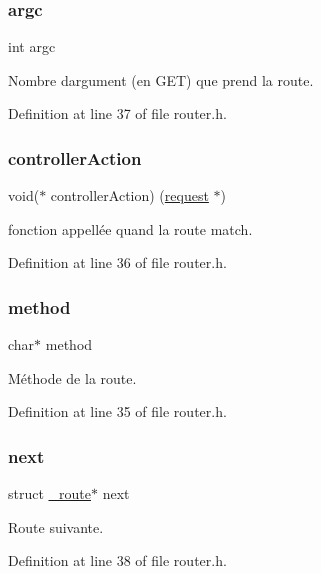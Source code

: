 \subsubsection{\texorpdfstring{argc}{argc}}
{\footnotesize\ttfamily int argc}

Nombre d\textquotesingle{}argument (en G\+ET) que prend la route. 

Definition at line 37 of file router.\+h.

\mbox{\label{struct__route_a36cb5ce2683da834da4b34eab0b3c8d5}} 
\subsubsection{\texorpdfstring{controller\+Action}{controllerAction}}
{\footnotesize\ttfamily void($\ast$ controller\+Action) (\mbox{\hyperlink{request_8h_a4a26bb67a195367b798ac6ad628c21a2}{request}} $\ast$)}

fonction appellée quand la route match. 

Definition at line 36 of file router.\+h.

\mbox{\label{struct__route_aca2544ecce27ac7a7e973d466c3a8fd4}} 
\subsubsection{\texorpdfstring{method}{method}}
{\footnotesize\ttfamily char$\ast$ method}

Méthode de la route. 

Definition at line 35 of file router.\+h.

\mbox{\label{struct__route_ada4cf7708c44661b9a4297823e1633ec}} 
\subsubsection{\texorpdfstring{next}{next}}
{\footnotesize\ttfamily struct \mbox{\hyperlink{struct__route}{\+\_\+route}}$\ast$ next}

Route suivante. 

Definition at line 38 of file router.\+h.

